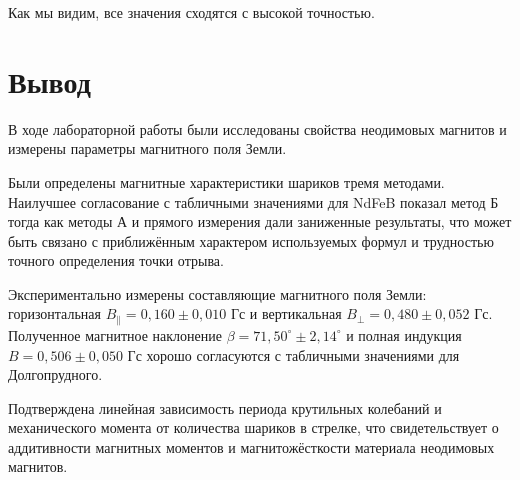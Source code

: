 \documentclass[a4paper]{article}
\begin{document}
Как мы видим, все значения сходятся с высокой точностью.
\section{Вывод}

В ходе лабораторной работы были исследованы свойства неодимовых магнитов и измерены параметры магнитного поля Земли. 

Были определены магнитные характеристики шариков тремя методами. Наилучшее согласование с табличными значениями для NdFeB показал метод Б тогда как методы А и прямого измерения дали заниженные результаты, что может быть связано с приближённым характером используемых формул и трудностью точного определения точки отрыва.

Экспериментально измерены составляющие магнитного поля Земли: горизонтальная $B_{\parallel} = 0,160 \pm 0,010$ Гс и вертикальная $B_{\perp} = 0,480 \pm 0,052$ Гс. Полученное магнитное наклонение $\beta = 71,50^\circ \pm 2,14^\circ$ и полная индукция $B = 0,506 \pm 0,050$ Гс хорошо согласуются с табличными значениями для Долгопрудного.

Подтверждена линейная зависимость периода крутильных колебаний и механического момента от количества шариков в стрелке, что свидетельствует о аддитивности магнитных моментов и магнитожёсткости материала неодимовых магнитов.
\end{document}
